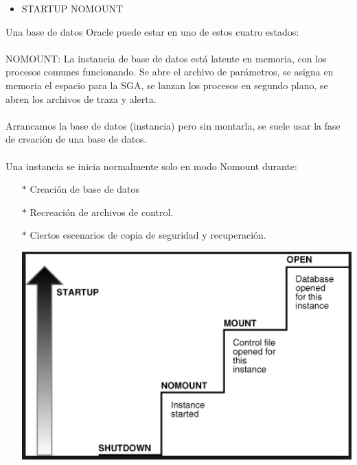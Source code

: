 \begin{itemize}
	\item STARTUP NOMOUNT 
\end{itemize}
\begin{adjustwidth}{0.40in}{0.0in}
	Una base de datos Oracle puede estar en uno de estos cuatro estados: \\ \\
	NOMOUNT: La instancia de base de datos está latente en memoria, con los procesos comunes funcionando. Se abre el archivo de parámetros, se asigna en memoria el espacio para la SGA, se lanzan los procesos en segundo plano, se abren los archivos de traza y alerta.\\ \\
	Arrancamos la base de datos (instancia) pero sin montarla, se suele usar la fase de creación de una base de datos.\\ \\
	Una instancia se inicia normalmente solo en modo Nomount durante:
	\begin{itemize}
		\item[$*$] Creación de base de datos
		\item[$*$] Recreación de archivos de control.
		\item[$*$] Ciertos escenarios de copia de seguridad y recuperación.\\

	\begin{center}
		\includegraphics[width=15.3cm]{./Imagenes/startup}
	\end{center}

	\end{itemize}
\end{adjustwidth}


